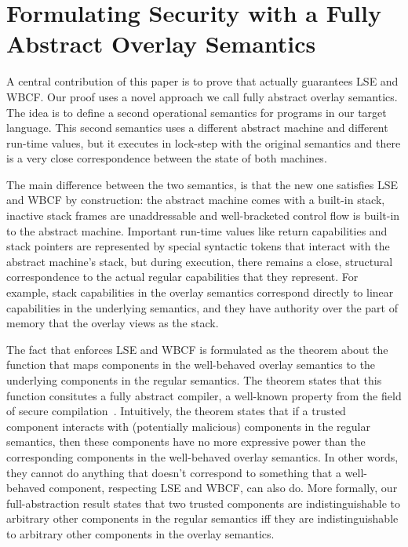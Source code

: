 \documentclass[acmsmall,review,anonymous]{acmart}\settopmatter{printfolios=true,printccs=false,printacmref=false}
\begin{document}
\section{Formulating Security with a Fully Abstract Overlay Semantics}
\label{sec:form-secur-with}
A central contribution of this paper is to prove that \stktokens{} actually guarantees LSE and WBCF.
Our proof uses a novel approach we call fully abstract overlay semantics.
The idea is to define a second operational semantics for programs in our target language.
This second semantics uses a different abstract machine and different run-time values, but it executes in lock-step with the original semantics and there is a very close correspondence between the state of both machines.

The main difference between the two semantics, is that the new one satisfies LSE and WBCF by construction: the abstract machine comes with a built-in stack, inactive stack frames are unaddressable and well-bracketed control flow is built-in to the abstract machine.
Important run-time values like return capabilities and stack pointers are represented by special syntactic tokens that interact with the abstract machine's stack, but during execution, there remains a close, structural correspondence to the actual regular capabilities that they represent.
For example, stack capabilities in the overlay semantics correspond directly to linear capabilities in the underlying semantics, and they have authority over the part of memory that the overlay views as the stack.

The fact that \stktokens{} enforces LSE and WBCF is formulated as the theorem about the function that maps components in the well-behaved overlay semantics to the underlying components in the regular semantics.
The theorem states that this function consitutes a fully abstract compiler, a well-known property from the field of secure compilation~\cite{abadi_protection_1999}.
Intuitively, the theorem states that if a trusted component interacts with (potentially malicious) components in the regular semantics, then these components have no more expressive power than the corresponding components in the well-behaved overlay semantics.
In other words, they cannot do anything that doesn't correspond to something that a well-behaved component, respecting LSE and WBCF, can also do.
More formally, our full-abstraction result states that two trusted components are indistinguishable to arbitrary other components in the regular semantics iff they are indistinguishable to arbitrary other components in the overlay semantics.
\end{document}
